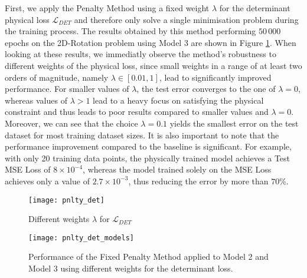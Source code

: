 First, we apply the Penalty Method using a fixed weight $\lambda$ for the determinant physical loss $\mathcal{L}_{DET}$ and therefore only solve a single minimisation problem during the training process. The results obtained by this method performing $50\,000$ epochs on the 2D-Rotation problem using Model 3 are shown in Figure \ref{fig:pnlty_det}. When looking at these results, we immediatly observe the method's robustness to different weights of the physical loss, since small weights in a range of at least two orders of magnitude, namely $\lambda \in [0.01, 1]$, lead to significantly improved performance. For smaller values of $\lambda$, the test error converges to the one of $\lambda= 0$, whereas values of $\lambda > 1$ lead to a heavy focus on satisfying the physical constraint and thus leads to poor results compared to smaller values and $\lambda=0$.\\
\indent Moreover, we can see that the choice $\lambda = 0.1$ yields the smallest error on the test dataset for most training dataset sizes. It is also important to note that the performance improvement compared to the baseline is significant. For example, with only 20 training data points, the physically trained model achieves a Test MSE Loss of $8\times10^{-4}$, whereas the model trained solely on the MSE Loss achieves only a value of $2.7\times10^{-3}$, thus reducing the error by more than $70\%$. \\
\begin{figure}[H]
	\centering
	\texttt{[image: pnlty\_det]}
	\caption{Different weights $\lambda$ for $\mathcal{L}_{DET}$}
	\label{fig:pnlty_det}
\end{figure}
\begin{figure}[H]
	\centering
	\texttt{[image: pnlty\_det\_models]}
	\caption{Performance of the Fixed Penalty Method applied to Model 2 and Model 3 using different weights for the determinant loss.}
	\label{fig:pnlty_det_models}
\end{figure}

